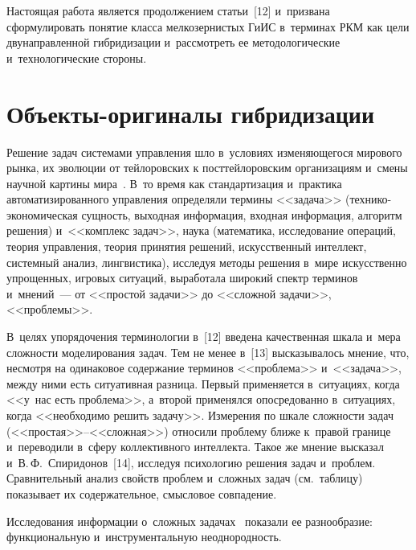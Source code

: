 \begin{multicols}{2}
  Настоящая работа является продолжением 
  \mbox{статьи}~[12] и~призвана сформулировать понятие класса мелкозернистых 
ГиИС в~терминах РКМ как цели двунаправленной гибридизации и~рассмотреть 
ее методологические  и~технологические стороны. 

\vspace*{-6pt}

\section{Объекты-оригиналы гибридизации }

  Решение задач системами управления шло в~условиях изменяющегося мирового рынка, их 
эволюции от тейлоровских к посттейлоровским организациям и~смены научной картины 
мира~\cite{8-kir}. В~то время как стандартизация и~практика автоматизированного 
управления определяли термины <<задача>> (тех\-ни\-ко-эко\-но\-ми\-че\-ская сущность, 
выходная информация, входная информация, алгоритм решения) и~<<комплекс задач>>, 
наука (математика, исследование операций, теория управления, теория принятия решений, 
искусственный интеллект, системный анализ, лингвистика), исследуя методы решения 
в~мире искусственно упрощенных, игровых ситуаций, выработала широкий спектр терминов 
и~мнений~--- от <<простой задачи>> до <<сложной задачи>>, <<проблемы>>. 

В~целях 
упорядочения терминологии в~[12] введена качественная шкала и~мера сложности 
моделирования задач. Тем не менее в~[13] высказывалось мнение, что, несмотря на 
одинаковое содержание терминов <<проблема>> и~<<задача>>, между ними есть 
ситуативная разница. Первый применяется в~ситуациях, когда <<у~нас %
 есть проб\-ле\-ма>>, 
а~второй применялся опосредованно в~ситуациях, когда <<необходимо решить %
задачу>>. 
Измерения по шкале сложности задач (<<прос\-тая>>--<<слож\-ная>>) относили проб\-ле\-му 
ближе к~правой границе и~переводили в~сферу коллективного интеллекта. Такое же мнение 
высказал и~В.\,Ф.~Спиридонов~[14], исследуя психологию решения задач и~проблем. 
Сравнительный анализ свойств проблем и~сложных задач (см.\ таблицу) показывает их 
содержательное, смыс\-ло\-вое совпадение. 
  

  
  Исследования информации о~сложных задачах~\cite{12-kir, 17-kir} показали ее 
разнообразие: функциональную и~инструментальную неоднородность.
  

\end{multicols}
